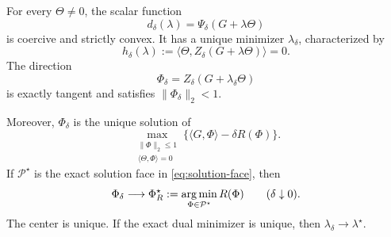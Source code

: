 \begin{theorem}
\label{thm:center-path}
For every \(\Theta\ne0\), the scalar function
\begin{equation}
 d_\delta(\lambda)=\Psi_\delta(G+\lambda\Theta)
 \label{eq:smooth-dual-main}
\end{equation}
is coercive and strictly convex.  It has a unique minimizer
\(\lambda_\delta\), characterized by
\begin{equation}
 h_\delta(\lambda)
 :=\langle\Theta,Z_\delta(G+\lambda\Theta)\rangle=0.
 \label{eq:smooth-root-main}
\end{equation}
The direction
\begin{equation}
 \Phi_\delta=Z_\delta(G+\lambda_\delta\Theta)
 \label{eq:Phi-delta-main}
\end{equation}
is exactly tangent and satisfies \(\|\Phi_\delta\|_2<1\).

Moreover, \(\Phi_\delta\) is the unique solution of
\begin{equation}
 \max_{\substack{\|\Phi\|_2\le1\\
                  \langle\Theta,\Phi\rangle=0}}
 \{\langle G,\Phi\rangle-\delta R(\Phi)\}.
 \label{eq:regularized-primal}
\end{equation}
If \(\mathcal P^\star\) is the exact solution face in
\eqref{eq:solution-face}, then
\begin{equation}
 \Phi_\delta\longrightarrow
 \Phi_R^\star:=\operatorname*{arg\,min}_{\Phi\in\mathcal P^\star}R(\Phi)
 \qquad(\delta\downarrow0).
 \label{eq:center-limit-main}
\end{equation}
The center is unique.  If the exact dual minimizer is unique, then
\(\lambda_\delta\to\lambda^\star\).
\end{theorem}

